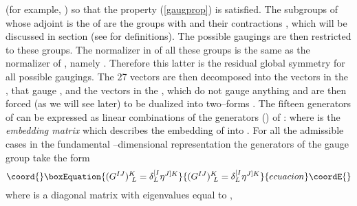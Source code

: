 \documentclass[a4paper,12pt]{article}
\def\bar{\overline}\end {picture}}
\begin{document}
(for example, \coordHE{})
so that the property (\ref{gaugprop}) is satisfied. The subgroups
of \coordHE{} whose adjoint is the \coordHE{} of
\coordHE{} are the \coordHE{} groups with
\coordHE{} and their contractions \coordHE{},
which will be discussed in section \coordHE{} (see
\cite{hull,hull2,noi4D} for definitions). The possible gaugings
are then restricted to these groups. The normalizer in
\coordHE{} of all these groups is the same as the
normalizer of \coordHE{}, namely
 \coordHE{}. Therefore this latter is the
residual global symmetry for all possible gaugings. The 27 vectors
\coordHE{} are then decomposed into the vectors \coordHE{} in the
\myHighlight{$\bf (\bar{15},1)$}\coordHE{}, that gauge \coordHE{}, and the vectors  in
the \coordHE{}, which do not gauge anything and are then forced
(as we will see later) to be dualized into two--forms
\coordHE{}. The fifteen generators \coordHE{} of \coordHE{}
can be expressed as linear combinations of the \coordHE{} generators
\coordHE{} (\coordHE{}) of
\coordHE{}: \coordHE{}
where \coordHE{} is the {\it embedding matrix} \cite{noi4D}
which describes the embedding of \coordHE{} into
\coordHE{}. For all the admissible cases  in the
fundamental \coordHE{}--dimensional representation the generators of
the gauge group \coordHE{} take the form \cite{gunwar}
\begin{equation}\coord{}\boxEquation{
(G^{IJ})^K_{~L}=\delta^{[I}_L\eta^{J]K}
\label{genfund}
}{
(G^{IJ})^K_{~L}=\delta^{[I}_L\eta^{J]K}
}{ecuacion}\coordE{}\end{equation}
where \coordHE{} is a diagonal matrix with \coordHE{} eigenvalues equal to \coordHE{},
\end{document}
